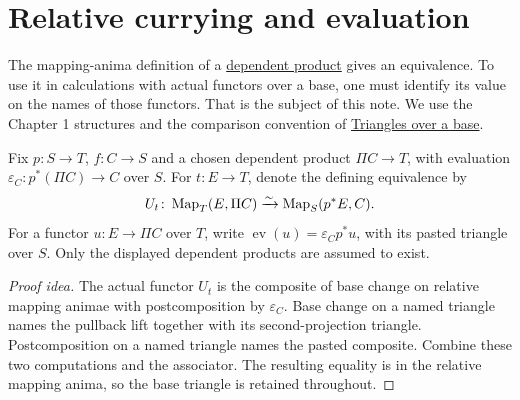 \documentclass[11pt]{article}
\begin{document}
\section*{Relative currying and evaluation}

The mapping-anima definition of a
\href{exponentiable-functors.html}{dependent product} gives an equivalence.
To use it in calculations with actual functors over a base, one must identify
its value on the names of those functors. That is the subject of this note.
We use the Chapter 1 structures and the comparison convention of
\href{supplementary-triangles-over-a-base.html}{Triangles over a base}.

Fix $p\colon S\to T$, $f\colon C\to S$ and a chosen dependent product
$\Pi C\to T$, with evaluation
$\varepsilon_C\colon p^*(\Pi C)\to C$ over $S$.
For $t\colon E\to T$, denote the defining equivalence by
\[
 U_t\colon\operatorname{Map}_T(E,\Pi C)\xrightarrow{\sim}\operatorname{Map}_S(p^*E,C).
\]
For a functor $u\colon E\to\Pi C$ over $T$, write
$\operatorname{ev}(u)=\varepsilon_Cp^*u$, with its pasted triangle over $S$.
Only the displayed dependent products are assumed to exist.

\begin{proof}[Proof idea]
The actual functor $U_t$ is the composite of base change on relative
mapping animae with postcomposition by $\varepsilon_C$.
Base change on a named triangle names the pullback lift together with its
second-projection triangle. Postcomposition on a named triangle names
the pasted composite. Combine these two computations and the associator.
The resulting equality is in the relative mapping anima, so the base
triangle is retained throughout.
\end{proof}
\end{document}
